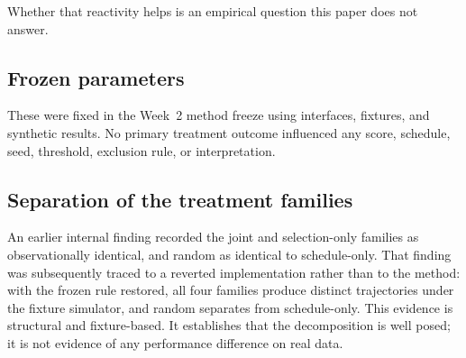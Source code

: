 Whether that reactivity helps is an empirical question this paper does not answer.

\subsection{Frozen parameters}

\begin{table}[h]
\centering
\caption{Frozen policy parameters, generated from \texttt{configs/policy/joint.json}.}

\end{table}

These were fixed in the Week~2 method freeze using interfaces, fixtures, and synthetic
results. No primary treatment outcome influenced any score, schedule, seed, threshold,
exclusion rule, or interpretation.

\subsection{Separation of the treatment families}

An earlier internal finding recorded the joint and selection-only families as
observationally identical, and random as identical to schedule-only. That finding was
subsequently traced to a reverted implementation rather than to the method: with the frozen
rule restored, all four families produce distinct trajectories under the fixture simulator,
and random separates from schedule-only. This evidence is structural and fixture-based. It
establishes that the decomposition is well posed; it is not evidence of any performance
difference on real data.
